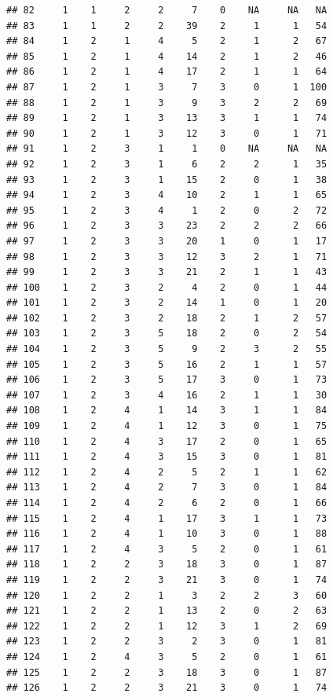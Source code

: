 \documentclass[krantz2]{krantz}\usepackage{knitr}%
\begin{document}
\begin{knitrout}
\begin{kframe}
\begin{verbatim}
## 82     1    1     2     2     7    0    NA     NA   NA
## 83     1    1     2     2    39    2     1      1   54
## 84     1    2     1     4     5    2     1      2   67
## 85     1    2     1     4    14    2     1      2   46
## 86     1    2     1     4    17    2     1      1   64
## 87     1    2     1     3     7    3     0      1  100
## 88     1    2     1     3     9    3     2      2   69
## 89     1    2     1     3    13    3     1      1   74
## 90     1    2     1     3    12    3     0      1   71
## 91     1    2     3     1     1    0    NA     NA   NA
## 92     1    2     3     1     6    2     2      1   35
## 93     1    2     3     1    15    2     0      1   38
## 94     1    2     3     4    10    2     1      1   65
## 95     1    2     3     4     1    2     0      2   72
## 96     1    2     3     3    23    2     2      2   66
## 97     1    2     3     3    20    1     0      1   17
## 98     1    2     3     3    12    3     2      1   71
## 99     1    2     3     3    21    2     1      1   43
## 100    1    2     3     2     4    2     0      1   44
## 101    1    2     3     2    14    1     0      1   20
## 102    1    2     3     2    18    2     1      2   57
## 103    1    2     3     5    18    2     0      2   54
## 104    1    2     3     5     9    2     3      2   55
## 105    1    2     3     5    16    2     1      1   57
## 106    1    2     3     5    17    3     0      1   73
## 107    1    2     3     4    16    2     1      1   30
## 108    1    2     4     1    14    3     1      1   84
## 109    1    2     4     1    12    3     0      1   75
## 110    1    2     4     3    17    2     0      1   65
## 111    1    2     4     3    15    3     0      1   81
## 112    1    2     4     2     5    2     1      1   62
## 113    1    2     4     2     7    3     0      1   84
## 114    1    2     4     2     6    2     0      1   66
## 115    1    2     4     1    17    3     1      1   73
## 116    1    2     4     1    10    3     0      1   88
## 117    1    2     4     3     5    2     0      1   61
## 118    1    2     2     3    18    3     0      1   87
## 119    1    2     2     3    21    3     0      1   74
## 120    1    2     2     1     3    2     2      3   60
## 121    1    2     2     1    13    2     0      2   63
## 122    1    2     2     1    12    3     1      2   69
## 123    1    2     2     3     2    3     0      1   81
## 124    1    2     4     3     5    2     0      1   61
## 125    1    2     2     3    18    3     0      1   87
## 126    1    2     2     3    21    3     0      1   74

\end{verbatim}
\end{kframe}
\end{knitrout}
\end{document}
